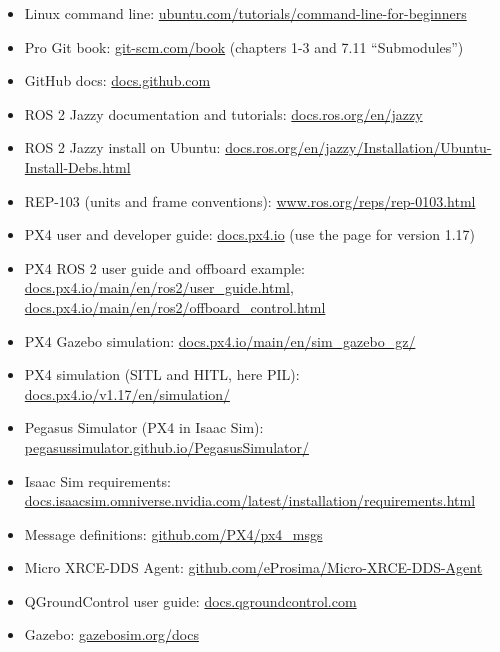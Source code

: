 \documentclass[11pt,a4paper]{article}
\begin{document}
\begin{itemize}
	\item
	      Linux command line:
	      \href{https://ubuntu.com/tutorials/command-line-for-beginners}{ubuntu.com/tutorials/command-line-for-beginners}
	\item
	      Pro Git book: \href{https://git-scm.com/book}{git-scm.com/book}
	      (chapters 1-3 and 7.11 ``Submodules'')
	\item
	      GitHub docs: \href{https://docs.github.com}{docs.github.com}
	\item
	      ROS 2 Jazzy documentation and tutorials:
	      \href{https://docs.ros.org/en/jazzy}{docs.ros.org/en/jazzy}
	\item
	      ROS 2 Jazzy install on Ubuntu:
	      \href{https://docs.ros.org/en/jazzy/Installation/Ubuntu-Install-Debs.html}{docs.ros.org/en/jazzy/Installation/Ubuntu-Install-Debs.html}
	\item
	      REP-103 (units and frame conventions):
	      \href{https://www.ros.org/reps/rep-0103.html}{www.ros.org/reps/rep-0103.html}
	\item
	      PX4 user and developer guide: \href{https://docs.px4.io}{docs.px4.io}
	      (use the page for version 1.17)
	\item
	      PX4 ROS 2 user guide and offboard example:
	      \href{https://docs.px4.io/main/en/ros2/user_guide.html}{docs.px4.io/main/en/ros2/user\_guide.html},
	      \href{https://docs.px4.io/main/en/ros2/offboard_control.html}{docs.px4.io/main/en/ros2/offboard\_control.html}
	\item
	      PX4 Gazebo simulation:
	      \href{https://docs.px4.io/main/en/sim_gazebo_gz/}{docs.px4.io/main/en/sim\_gazebo\_gz/}
	\item
	      PX4 simulation (SITL and HITL, here PIL):
	      \href{https://docs.px4.io/v1.17/en/simulation/}{docs.px4.io/v1.17/en/simulation/}
	\item
	      Pegasus Simulator (PX4 in Isaac Sim):
	      \href{https://pegasussimulator.github.io/PegasusSimulator/}{pegasussimulator.github.io/PegasusSimulator/}
	\item
	      Isaac Sim requirements:
	      \href{https://docs.isaacsim.omniverse.nvidia.com/latest/installation/requirements.html}{docs.isaacsim.omniverse.nvidia.com/latest/installation/requirements.html}
	\item
	      Message definitions:
	      \href{https://github.com/PX4/px4_msgs}{github.com/PX4/px4\_msgs}
	\item
	      Micro XRCE-DDS Agent:
	      \href{https://github.com/eProsima/Micro-XRCE-DDS-Agent}{github.com/eProsima/Micro-XRCE-DDS-Agent}
	\item
	      QGroundControl user guide:
	      \href{https://docs.qgroundcontrol.com}{docs.qgroundcontrol.com}
	\item
	      Gazebo: \href{https://gazebosim.org/docs}{gazebosim.org/docs}
\end{itemize}
\end{document}
